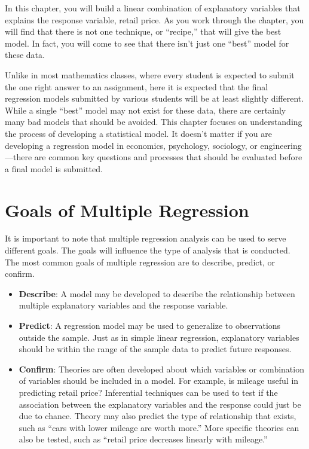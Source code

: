\documentclass[
]{book}
\providecommand{\tightlist}{%
  \setlength{\itemsep}{0pt}\setlength{\parskip}{0pt}}
\begin{document}
In this chapter, you will build a linear combination of explanatory variables that explains the response variable, retail price. As you work through the chapter, you will find that there is not one technique, or ``recipe,'' that will give the best model. In fact, you will come to see that there isn't just one ``best'' model for these data.

Unlike in most mathematics classes, where every student is expected to submit the one right answer to an assignment, here it is expected that the final regression models submitted by various students will be at least slightly different. While a single ``best'' model may not exist for these data, there are certainly many bad models that should be avoided. This chapter focuses on understanding the process of developing a statistical
model. It doesn't matter if you are developing a regression model in economics, psychology, sociology, or engineering---there are common key questions and processes that should be evaluated before a final model is submitted.

\hypertarget{goals-of-multiple-regression}{%
\section{Goals of Multiple Regression}\label{goals-of-multiple-regression}}

It is important to note that multiple regression analysis can be used to serve different goals. The goals will influence the type of analysis that is conducted. The most common goals of multiple regression are to describe, predict, or confirm.

\begin{itemize}
\tightlist
\item
  \textbf{Describe}: A model may be developed to describe the relationship between multiple explanatory variables and the response variable.
\item
  \textbf{Predict}: A regression model may be used to generalize to observations outside the sample. Just as in simple linear regression, explanatory variables should be within the range of the sample data to predict future responses.
\item
  \textbf{Confirm}: Theories are often developed about which variables or combination of variables should be included in a model. For example, is mileage useful in predicting retail price? Inferential techniques can be used to test if the association between the explanatory variables and the response could just be due to chance. Theory may also predict the type of relationship that exists, such as ``cars with lower mileage are worth more.'' More specific theories can also be tested, such as ``retail price decreases linearly with mileage.''
\end{itemize}
\end{document}
